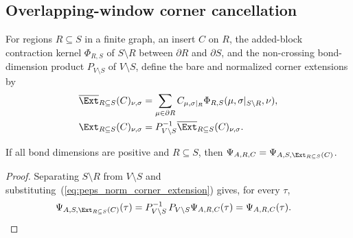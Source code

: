 \subsection{Overlapping-window corner cancellation}
\label{subsec:peps_torus_overlap_corner_cancellation}

\begin{definition}
    \label{def:peps_corner_extension}
    \leanok
    For regions $R\subseteq S$ in a finite graph, an insert $C$ on $R$, the
    added-block contraction kernel $\Phi_{R,S}$ of $S\setminus R$ between
    $\partial R$ and $\partial S$, and the non-crossing bond-dimension product
    $P_{V\setminus S}$ of $V\setminus S$, define the bare and normalized corner
    extensions \cite[Section~4, proof of Theorem~3]{Molnar2018NormalPEPS} by
    \begin{align}
        \overline{\Ext}_{R\subseteq S}(C)_{\nu,\sigma}
         & =
        \sum_{\mu\in \partial R}
        C_{\mu,\sigma|_R}
        \Phi_{R,S}(\mu,\sigma|_{S\setminus R},\nu),
        \label{eq:peps_bare_corner_extension} \\
        \Ext_{R\subseteq S}(C)_{\nu,\sigma}
         & =
        P_{V\setminus S}^{-1}
        \overline{\Ext}_{R\subseteq S}(C)_{\nu,\sigma}.
        \label{eq:peps_norm_corner_extension}
    \end{align}
\end{definition}

\begin{lemma}
    \label{thm:peps_corner_extension_state_preserves}
    \leanok
    If all bond dimensions are positive and $R\subseteq S$, then
    $\Psi_{A,R,C}=\Psi_{A,S,\Ext_{R\subseteq S}(C)}$.
\end{lemma}
\begin{proof}\leanok
    Separating $S\setminus R$ from $V\setminus S$ and substituting~(\ref{eq:peps_norm_corner_extension})
    gives, for every $\tau$,
    \begin{align}
        \Psi_{A,S,\Ext_{R\subseteq S}(C)}(\tau)
         & =
        P_{V\setminus S}^{-1}\,P_{V\setminus S}
        \Psi_{A,R,C}(\tau)
        =
        \Psi_{A,R,C}(\tau).
        \notag
    \end{align}
\end{proof}


